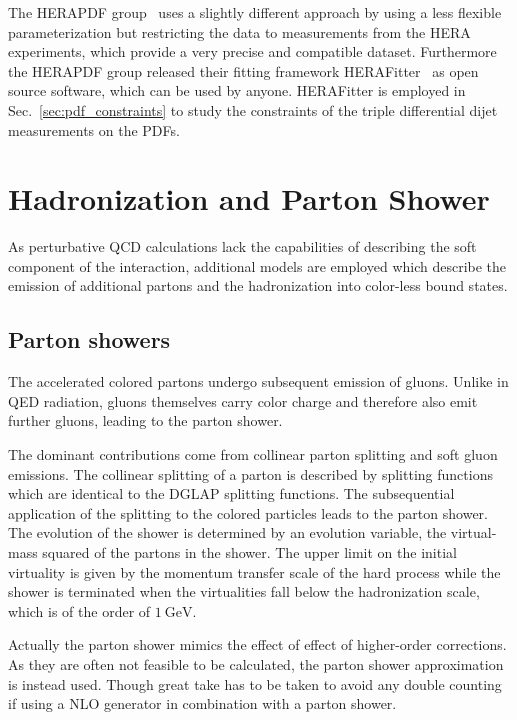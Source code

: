 The HERAPDF group~\cite{Abramowicz:2015mha} uses a slightly different approach
by using a less flexible parameterization but restricting the data to
measurements from the HERA experiments, which provide a very precise and
compatible dataset. Furthermore the HERAPDF group released their fitting
framework HERAFitter~\cite{Alekhin:2014irh} as open source software, which can
be used by anyone.  HERAFitter is employed in Sec.~\ref{sec:pdf_constraints} to
study the constraints of the triple differential dijet measurements on the PDFs.

\section{Hadronization and Parton Shower}

As perturbative QCD calculations lack the capabilities of describing the
soft component of the interaction, additional models are employed which describe
the emission of additional partons and the hadronization into color-less bound
states. 

\subsection{Parton showers}

The accelerated colored partons undergo subsequent emission of gluons. Unlike in
QED radiation, gluons themselves carry color charge and therefore also emit
further gluons, leading to the parton shower. 

The dominant contributions come from collinear parton splitting and soft gluon
emissions. The collinear splitting of a parton is described by splitting
functions which are identical to the DGLAP splitting functions. The
subsequential application of the splitting to the colored particles leads to the
parton shower. The evolution of the shower is determined by an evolution
variable, \eg the virtual-mass squared of the partons in the shower. The upper
limit on the initial virtuality is given by the momentum transfer scale of the
hard process while the shower is terminated when the virtualities fall below the
hadronization scale, which is of the order of $\SI{1}{\GeV}$.

Actually the parton shower mimics the effect of effect of higher-order
corrections. As they are often not feasible to be calculated, the parton shower
approximation is instead used. Though great take has to be taken to avoid any
double counting if using a NLO generator in combination with a parton shower.


